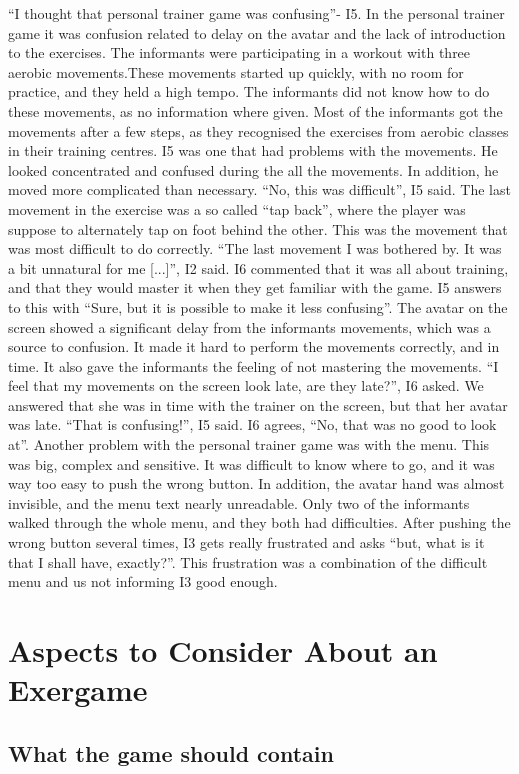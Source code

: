 “I thought that personal trainer game was confusing”- I5. In the personal trainer game it was confusion related to delay on the avatar and the lack of introduction to the exercises. The informants were participating in a workout with three aerobic movements.These movements started up quickly, with no room for practice, and they held a high tempo. The informants did not know how to do these movements, as no information where given. Most of the informants got the movements after a few steps, as they recognised the exercises from aerobic classes in their training centres. I5 was one that had problems with the movements. He looked concentrated and confused during the all the movements. In addition, he moved more complicated than necessary. “No, this was difficult”, I5 said. The last movement in the exercise was a so called “tap back”, where the player was suppose to alternately tap on foot behind the other. This was the movement that was most difficult to do correctly. “The last movement I was bothered by. It was a bit unnatural for me [...]”, I2 said. I6 commented that it was all about training, and that they would master it when they get familiar with the game. I5 answers to this with “Sure, but it is possible to make it less confusing”. The avatar on the screen showed a significant delay from the informants movements, which was a source to confusion. It made it hard to perform the movements correctly, and in time. It also gave the informants the feeling of not mastering the movements. “I feel that my movements on the screen look late, are they late?”, I6 asked. We answered that she was in time with the trainer on the screen, but that her avatar was late. “That is confusing!”, I5 said. I6 agrees, “No, that was no good to look at”. Another problem with the personal trainer game was with the menu. This was big, complex and sensitive. It was difficult to know where to go, and it was way too easy to push the wrong button. In addition, the avatar hand was almost invisible, and the menu text nearly unreadable. Only two of the informants walked through the whole menu, and they both had difficulties. After pushing the wrong button several times, I3 gets really frustrated and asks “but, what is it that I shall have, exactly?”. This frustration was a combination of the difficult menu and us not informing I3 good enough.

\section{Aspects to Consider About an Exergame}
\subsection{What the game should contain}

